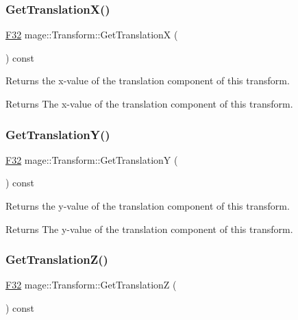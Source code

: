 \subsubsection{\texorpdfstring{Get\+Translation\+X()}{GetTranslationX()}}
{\footnotesize\ttfamily \hyperlink{namespacemage_aa97e833b45f06d60a0a9c4fc22ae02c0}{F32} mage\+::\+Transform\+::\+Get\+TranslationX (\begin{DoxyParamCaption}{ }\end{DoxyParamCaption}) const\hspace{0.3cm}{\ttfamily [noexcept]}}

Returns the x-\/value of the translation component of this transform.

\begin{DoxyReturn}{Returns}
The x-\/value of the translation component of this transform. 
\end{DoxyReturn}
\hypertarget{classmage_1_1_transform_a3a806edeeca4db92bdfa4d401ba17cb4}{}\label{classmage_1_1_transform_a3a806edeeca4db92bdfa4d401ba17cb4} 
\subsubsection{\texorpdfstring{Get\+Translation\+Y()}{GetTranslationY()}}
{\footnotesize\ttfamily \hyperlink{namespacemage_aa97e833b45f06d60a0a9c4fc22ae02c0}{F32} mage\+::\+Transform\+::\+Get\+TranslationY (\begin{DoxyParamCaption}{ }\end{DoxyParamCaption}) const\hspace{0.3cm}{\ttfamily [noexcept]}}

Returns the y-\/value of the translation component of this transform.

\begin{DoxyReturn}{Returns}
The y-\/value of the translation component of this transform. 
\end{DoxyReturn}
\hypertarget{classmage_1_1_transform_a2899159e8e953026bf8b6863c65f454f}{}\label{classmage_1_1_transform_a2899159e8e953026bf8b6863c65f454f} 
\subsubsection{\texorpdfstring{Get\+Translation\+Z()}{GetTranslationZ()}}
{\footnotesize\ttfamily \hyperlink{namespacemage_aa97e833b45f06d60a0a9c4fc22ae02c0}{F32} mage\+::\+Transform\+::\+Get\+TranslationZ (\begin{DoxyParamCaption}{ }\end{DoxyParamCaption}) const\hspace{0.3cm}{\ttfamily [noexcept]}}

